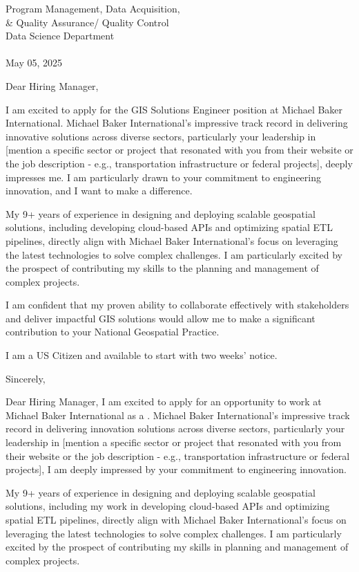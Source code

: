 \documentclass[letterpaper]{article}
\begin{document}
\large
Program Management, Data Acquisition, \\
\qquad \& Quality Assurance/ Quality Control \\
Data Science Department \\
\textbf{\JobCompany} \\

\null\hfill May 05, 2025

Dear Hiring Manager,

I am excited to apply for the GIS Solutions Engineer position at Michael Baker International. Michael Baker International's impressive track record in delivering innovative solutions across diverse sectors, particularly your leadership in [mention a specific sector or project that resonated with you from their website or the job description - e.g., transportation infrastructure or federal projects], deeply impresses me. I am particularly drawn to your commitment to engineering innovation, and I want to make a difference.

My 9+ years of experience in designing and deploying scalable geospatial solutions, including developing cloud-based APIs and optimizing spatial ETL pipelines, directly align with Michael Baker International's focus on leveraging the latest technologies to solve complex challenges. I am particularly excited by the prospect of contributing my skills to the planning and management of complex projects.

I am confident that my proven ability to collaborate effectively with stakeholders and deliver impactful GIS solutions would allow me to make a significant contribution to your National Geospatial Practice.

I am a US Citizen and available to start with two weeks' notice.

Sincerely,


Dear Hiring Manager,
I am excited to apply for an opportunity to work at Michael Baker International as a \JobTitle.
Michael Baker International's impressive track record in delivering innovation solutions across diverse sectors, 
particularly your leadership in [mention a
specific sector or project that resonated with you from their website or the
job description - e.g., transportation infrastructure or federal projects], I
am deeply impressed by your commitment to engineering innovation.

My 9+ years of experience in designing and deploying scalable geospatial solutions, including my work in developing cloud-based APIs and
optimizing spatial ETL pipelines, directly align with Michael Baker International's focus on leveraging the latest technologies to solve complex
challenges. 
I am particularly excited by the prospect of contributing my skills in planning and management of complex projects.
\end{document}

